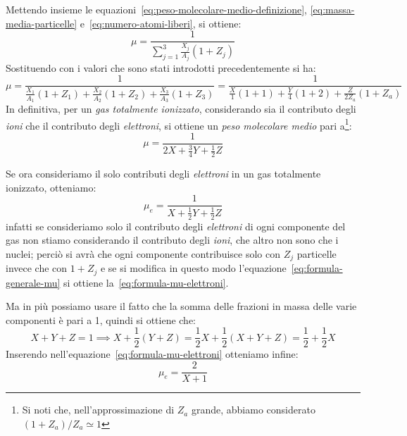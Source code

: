 Mettendo insieme le equazioni~\eqref{eq:peso-molecolare-medio-definizione}, \eqref{eq:massa-media-particelle} e~\eqref{eq:numero-atomi-liberi}, si ottiene:
\begin{equation}
    \mu = \dfrac{1}{\sum_{j=1}^3 \frac{X_j}{A_j} (1+Z_j)}
    \label{eq:formula-generale-mu}
\end{equation}
Sostituendo con i valori che sono stati introdotti precedentemente si ha:
\[
\mu = \dfrac{1}{\frac{X_1}{A_1}(1+Z_1) + \frac{X_2}{A_2}(1+Z_2) + \frac{X_3}{A_3}(1+Z_3)} = \dfrac{1}{\frac{X}{1}(1+1) + \frac{Y}{4}(1+2) + \frac{Z}{2 Z_a}(1+Z_a)}
\]
In definitiva, per un \emph{gas totalmente ionizzato}, considerando sia il contributo degli \emph{ioni} che il contributo degli \emph{elettroni}, si ottiene un \emph{peso molecolare medio} pari a\footnote{Si noti che, nell'approssimazione di $Z_a$ grande, abbiamo considerato $(1+Z_a)/Z_a \simeq 1$}:
\begin{equation}\label{eq:peso-molecolare-gas-ionizzato}
    \mu = \dfrac{1}{2 X + \frac{3}{4} Y + \frac{1}{2} Z}
\end{equation}

Se ora consideriamo il solo contributi degli \emph{elettroni} in un gas totalmente ionizzato, otteniamo:
\begin{equation}
    \mu_e = \dfrac{1}{X + \frac{1}{2} Y + \frac{1}{2}Z}
    \label{eq:formula-mu-elettroni}
\end{equation}
infatti se consideriamo solo il contributo degli \emph{elettroni} di ogni componente del gas non stiamo considerando il contributo degli \emph{ioni}, che altro non sono che i nuclei; perciò si avrà che ogni componente contribuisce solo con $Z_j$ particelle invece che con $1+Z_j$ e se si modifica in questo modo l'equazione~\eqref{eq:formula-generale-mu} si ottiene la~\eqref{eq:formula-mu-elettroni}.

Ma in più possiamo usare il fatto che la somma delle frazioni in massa delle varie componenti è pari a 1, quindi si ottiene che:  
\[
X+Y+Z=1 \implies X + \frac{1}{2}(Y+Z) = \frac{1}{2}X + \frac{1}{2}(X+Y+Z) =\frac{1}{2} + \frac{1}{2}X
\]
Inserendo nell'equazione~\eqref{eq:formula-mu-elettroni} otteniamo infine:
\begin{equation}\label{eq:peso-molecolare-elettroni}
    \mu_e = \dfrac{2}{X+1}
\end{equation}

